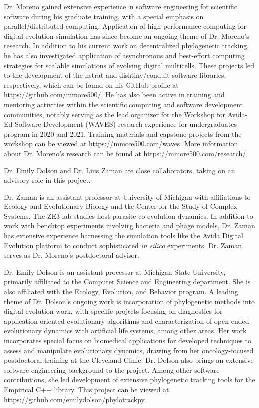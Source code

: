 Dr. Moreno gained extensive experience in software engineering for scientific software during his graduate training, with a special emphasis on parallel/distributed computing.
Application of high-performance computing for digital evolution simulation has since become an ongoing theme of Dr. Moreno's research.
In addition to his current work on decentralized phylogenetic tracking, he has also investigated application of asynchronous and best-effort computing strategies for scalable simulations of evolving digital multicells.
These projects led to the development of the hstrat and dishtiny/conduit software libraries, respectively, which can be found on his GitHub profile at \url{https://github.com/mmore500/}.
He has also been active in training and mentoring activities within the scientific computing and software development communities, notably serving as the lead organizer for the Workshop for Avida-Ed Software Development (WAVES) research experience for undergraduates program in 2020 and 2021.
Training materials and capstone projects from the workshop can be viewed at \url{https://mmore500.com/waves}.
More information about Dr. Moreno's research can be found at \url{https://mmore500.com/research/}.

Dr. Emily Dolson and Dr. Luis Zaman are close collaborators, taking on an advisory role in this project.

Dr. Zaman is an assistant professor at University of Michigan with affiliations to Ecology and Evolutionary Biology and the Center for the Study of Complex Systems.
The ZE3 lab studies host-parasite co-evolution dynamics.
In addition to work with benchtop experiments involving bacteria and phage models, Dr. Zaman has extensive experience harnessing the simulation tools like the Avida Digital Evolution platform to conduct sophisticated \textit{in silico} experiments.
Dr. Zaman serves as Dr. Moreno's postdoctoral advisor.

Dr. Emily Dolson is an assistant processor at Michigan State University, primarily affiliated to the Computer Science and Engineering department.
She is also affiliated with the Ecology, Evolution, and Behavior program.
A leading theme of Dr. Dolson's ongoing work is incorporation of phylogenetic methods into digital evolution work, with specific projects focusing on diagnostics for application-oriented evolutionary algorithms and characterization of open-ended evolutionary dynamics with artificial life systems, among other areas.
Her work incorporates special focus on biomedical applications for developed techniques to assess and manipulate evolutionary dynamics, drawing from her oncology-focused postdoctoral training at the Cleveland Clinic.
Dr. Dolson also brings an extensive software engineering background to the project.
Among other software contributions, she led development of extensive phylogenetic tracking tools for the Empirical C++ library.
This project can be viewed at \url{https://github.com/emilydolson/phylotrackpy}.


